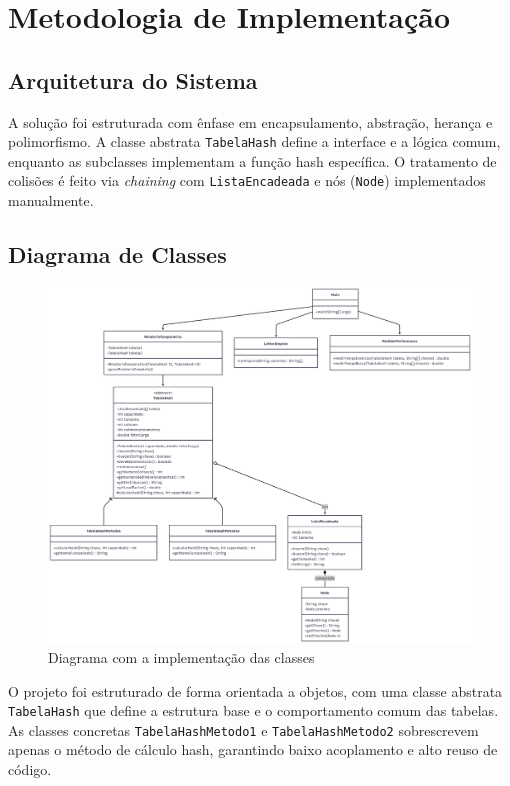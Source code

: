 \documentclass[12pt,a4paper]{abntex2}
\begin{document}
\section{Metodologia de Implementação}

\subsection{Arquitetura do Sistema}
A solução foi estruturada com ênfase em encapsulamento, abstração, herança e polimorfismo. A classe abstrata \texttt{TabelaHash} define a interface e a lógica comum, enquanto as subclasses implementam a função hash específica. O tratamento de colisões é feito via \textit{chaining} com \texttt{ListaEncadeada} e nós (\texttt{Node}) implementados manualmente.

\subsection{Diagrama de Classes}

\begin{figure}[h]
    \centering
    \includegraphics[width=1\textwidth]{DiagramClasses.png}
    \caption{Diagrama com a implementação das classes}
    \label{fig:minha_imagem}
\end{figure}


O projeto foi estruturado de forma orientada a objetos, com uma classe abstrata \texttt{TabelaHash} que define a estrutura base e o comportamento comum das tabelas. As classes concretas \texttt{TabelaHashMetodo1} e \texttt{TabelaHashMetodo2} sobrescrevem apenas o método de cálculo hash, garantindo baixo acoplamento e alto reuso de código.
\end{document}
